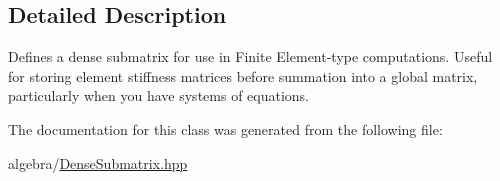 \subsection{Detailed Description}
Defines a dense submatrix for use in Finite Element-\/type computations. Useful for storing element stiffness matrices before summation into a global matrix, particularly when you have systems of equations. 

The documentation for this class was generated from the following file\+:\begin{DoxyCompactItemize}
\item 
algebra/\mbox{\hyperlink{_dense_submatrix_8hpp}{Dense\+Submatrix.\+hpp}}\end{DoxyCompactItemize}
